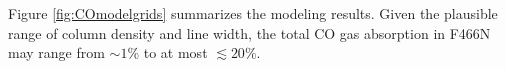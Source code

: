 \documentclass[times,astrosymb,twocolumn]{aastex631}
\begin{document}
Figure \ref{fig:COmodelgrids} summarizes the modeling results.
Given the plausible range of column density and line width,
the total CO gas absorption in F466N may range from $\sim1\%$ to at most $\lesssim20\%$.
\end{document}
